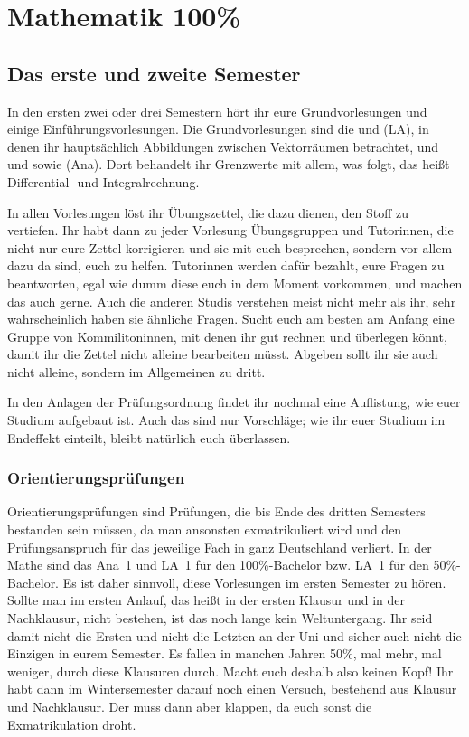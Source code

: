 \section{Mathematik 100\%}

\subsection{Das erste und zweite Semester}

In den ersten zwei oder drei Semestern hört ihr eure Grundvorlesungen und einige Einführungsvorlesungen. Die Grundvorlesungen sind die  und  (\gls{LA}), in denen ihr hauptsächlich Abbildungen zwischen Vektorräumen betrachtet, und  und  sowie  (\gls{Ana}). Dort behandelt ihr Grenzwerte mit allem, was folgt, das heißt Differential- und Integralrechnung.

In allen Vorlesungen löst ihr Übungszettel, die dazu dienen, den Stoff zu vertiefen. Ihr habt dann zu jeder Vorlesung Übungsgruppen und Tutorinnen, die nicht nur eure Zettel korrigieren und sie mit euch besprechen, sondern vor allem dazu da sind, euch zu helfen. Tutorinnen werden dafür bezahlt, eure Fragen zu beantworten, egal wie dumm diese euch in dem Moment vorkommen, und machen das auch gerne. Auch die anderen Studis verstehen meist nicht mehr als ihr, sehr wahrscheinlich haben sie ähnliche Fragen. Sucht euch am besten am Anfang eine Gruppe von Kommilitoninnen, mit denen ihr gut rechnen und überlegen könnt, damit ihr die Zettel nicht alleine bearbeiten müsst. Abgeben sollt ihr sie auch nicht alleine, sondern im Allgemeinen zu dritt.

In den Anlagen der Prüfungsordnung findet ihr nochmal eine Auflistung, wie euer Studium aufgebaut ist. Auch das sind nur Vorschläge; wie ihr euer Studium im Endeffekt einteilt, bleibt natürlich euch überlassen.

\subsubsection{Orientierungsprüfungen}

Orientierungsprüfungen sind Prüfungen, die bis Ende des dritten Semesters bestanden sein müssen, da man ansonsten exmatrikuliert wird und den Prüfungsanspruch für das jeweilige Fach in ganz Deutschland verliert. In der Mathe sind das \gls{Ana}~1 und \gls{LA}~1 für den 100\%-Bachelor bzw. \gls{LA}~1 für den 50\%-Bachelor. Es ist daher sinnvoll, diese Vorlesungen im ersten Semester zu hören. Sollte man im ersten Anlauf, das heißt in der ersten Klausur und in der Nachklausur, nicht bestehen, ist das noch lange kein Weltuntergang. Ihr seid damit nicht die Ersten und nicht die Letzten an der Uni und sicher auch nicht die Einzigen in eurem Semester. Es fallen in manchen Jahren 50\%, mal mehr, mal weniger, durch diese Klausuren durch. Macht euch deshalb also keinen Kopf! Ihr habt dann im Wintersemester darauf noch einen Versuch, bestehend aus Klausur und Nachklausur. Der muss dann aber klappen, da euch sonst die Exmatrikulation droht.

